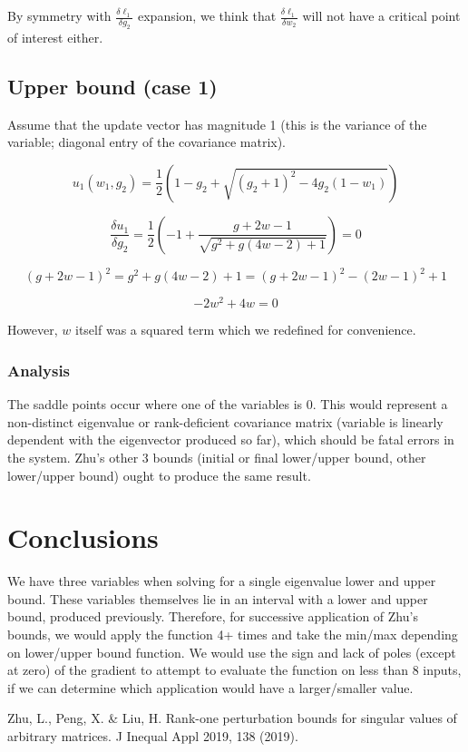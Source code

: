 \documentclass{article}
\begin{document}
By symmetry with $\frac{\delta \ell_1}{\delta g_2}$ expansion, we think that $\frac{\delta \ell_1}{\delta w_2}$ will not have a critical point of interest either.

\subsection{Upper bound (case 1)}

Assume that the update vector has magnitude 1 (this is the variance of the variable; diagonal entry of the covariance matrix).

$$
u_1(w_1, g_2) = \frac{1}{2} \left( 1 - g_2 + \sqrt{(g_2 + 1)^2 - 4g_2 (1 - w_1)} \right)
$$

$$
\frac{\delta u_1}{\delta g_2}
=
\frac{1}{2}
\left(
    -1 + \frac{g+2w-1}{\sqrt{g^2+g(4w-2)+1}}
\right)
= 0
$$

$$
(g+2w-1)^2 = g^2 + g(4w-2) + 1 = (g+2w-1)^2 - (2w-1)^2 + 1
$$

$$
-2w^2 + 4w = 0
$$

However, $w$ itself was a squared term which we redefined for convenience.

\subsubsection{Analysis}

The saddle points occur where one of the variables is 0. This would represent a non-distinct eigenvalue or rank-deficient covariance matrix (variable is linearly dependent with the eigenvector produced so far), which should be fatal errors in the system. Zhu's other 3 bounds (initial or final lower/upper bound, other lower/upper bound) ought to produce the same result.

\section{Conclusions}

We have three variables when solving for a single eigenvalue lower and upper bound. These variables themselves lie in an interval with a lower and upper bound, produced previously. Therefore, for successive application of Zhu's bounds, we would apply the function 4+ times and take the min/max depending on lower/upper bound function. We would use the sign and lack of poles (except at zero) of the gradient to attempt to evaluate the function on less than 8 inputs, if we can determine which application would have a larger/smaller value.

\begin{thebibliography}{9}
     Zhu, L., Peng, X. \& Liu, H. Rank-one perturbation bounds for singular values of arbitrary matrices. J Inequal Appl 2019, 138 (2019).
\end{thebibliography}
\end{document}
